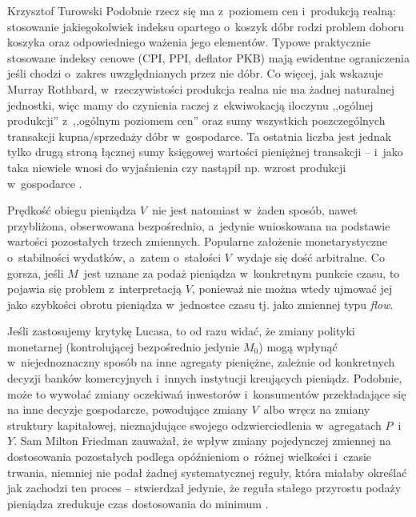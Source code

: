 \begin{artplenv}{Krzysztof Turowski}
Podobnie rzecz się ma z~poziomem cen i~produkcją realną: stosowanie jakiegokolwiek indeksu opartego o~koszyk dóbr rodzi
problem doboru koszyka oraz odpowiedniego ważenia jego elementów. Typowe praktycznie stosowane indeksy cenowe (CPI,
PPI, deflator PKB) mają ewidentne ograniczenia jeśli chodzi o~zakres uwzględnianych przez nie dóbr. Co więcej, jak
wskazuje Murray Rothbard, w~rzeczywistości produkcja realna nie ma żadnej naturalnej jednostki, więc mamy do czynienia
raczej z~ekwiwokacją iloczynu ,,ogólnej produkcji'' z~,,ogólnym poziomem cen'' oraz sumy wszystkich poszczególnych
transakcji kupna/sprzedaży dóbr w~gospodarce. Ta ostatnia liczba jest jednak tylko drugą stroną łącznej sumy księgowej
wartości pieniężnej transakcji  --  i~jako taka niewiele wnosi do wyjaśnienia czy nastąpił np. wzrost
produkcji w~gospodarce
\parencite{rothbard_man_1962}.

Prędkość obiegu pieniądza $V$~nie jest natomiast w~żaden sposób, nawet przybliżona, obserwowana
bezpośrednio, a~jedynie wnioskowana na podstawie wartości pozostałych trzech zmiennych. Popularne założenie
monetarystyczne o~stabilności wydatków, a~zatem o~stałości $V$~wydaje się dość arbitralne. Co gorsza, jeśli $M$~jest uznane
za podaż pieniądza w~konkretnym punkcie czasu, to pojawia się problem z~interpretacją $V$, ponieważ nie można
wtedy ujmować jej jako szybkości obrotu pieniądza w~jednostce czasu tj. jako zmiennej typu \textit{flow}.

Jeśli zastosujemy krytykę Lucasa, to od razu widać, że zmiany polityki monetarnej (kontrolującej bezpośrednio jedynie
$M_0$) mogą wpłynąć w~niejednoznaczny sposób na inne agregaty pieniężne, zależnie od
konkretnych decyzji banków komercyjnych i~innych instytucji kreujących pieniądz. Podobnie, może to wywołać zmiany
oczekiwań inwestorów i~konsumentów przekładające się na inne decyzje gospodarcze, powodujące zmiany $V$~albo
wręcz na zmiany struktury kapitałowej, nieznajdujące swojego odzwierciedlenia w~agregatach $P$~i~$Y$.
Sam Milton Friedman zauważał, że wpływ zmiany pojedynczej zmiennej na dostosowania pozostałych podlega
opóźnieniom o~różnej wielkości i~czasie trwania, niemniej nie podał żadnej systematycznej reguły, która miałaby określać jak
zachodzi ten proces  --  stwierdzał jedynie, że reguła stałego przyrostu podaży pieniądza zredukuje czas
dostosowania do minimum
\parencite{friedman_counter-revolution_1996}.


\end{artplenv}
